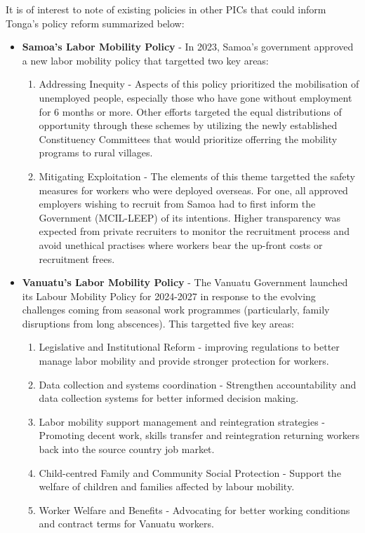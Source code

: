 \documentclass[9pt,a4paper,twocolumn,twoside]{tau-class/tau}
\begin{document}
It is of interest to note of existing policies in other PICs that could inform Tonga's policy reform summarized below:



\begin{itemize}
\item \textbf{Samoa's Labor Mobility Policy} - In 2023, Samoa's government approved a new labor mobility policy that targetted two key areas: 
\begin{enumerate}
    \item Addressing Inequity - Aspects of this policy prioritized the mobilisation of unemployed people, especially those who have gone without employment for 6 months or more. Other efforts targeted the equal distributions of opportunity through these schemes by utilizing the newly established Constituency Committees that would prioritize offerring the mobility programs to rural villages.
    \item Mitigating Exploitation - The elements of this theme targetted the safety measures for workers who were deployed overseas. For one, all approved employers wishing to recruit from Samoa had to first inform the Government (MCIL-LEEP) of its intentions. Higher transparency was expected from private recruiters to monitor the recruitment process and avoid unethical practises where workers bear the up-front costs or recruitment frees.
\end{enumerate}


\item \textbf{Vanuatu's Labor Mobility Policy} - The Vanuatu Government launched its Labour Mobility Policy for 2024-2027 in response to the evolving challenges coming from seasonal work programmes (particularly, family disruptions from long abscences). This targetted five key areas:
\begin{enumerate}
    \item Legislative and Institutional Reform - improving regulations to better manage labor mobility and provide stronger protection for workers.
    \item Data collection and systems coordination - Strengthen accountability and data collection systems for better informed decision making.
    \item Labor mobility support management and reintegration strategies - Promoting decent work, skills transfer and reintegration returning workers back into the source country job market.
    \item Child-centred Family and Community Social Protection - Support the welfare of children and families affected by labour mobility.
    \item Worker Welfare and Benefits - Advocating for better working conditions and contract terms for Vanuatu workers.
\end{enumerate}

\end{itemize}
\end{document}
